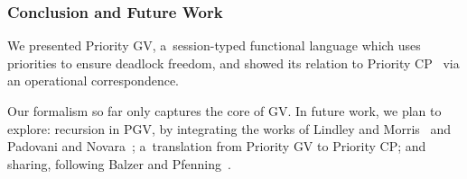 \documentclass[main.tex]{subfiles}
\begin{document}
\subsubsection*{Conclusion and Future Work}
We presented Priority GV, a~session-typed functional language which uses priorities to ensure deadlock freedom, and showed its relation to Priority CP~\cite{dardhagay18} via an operational correspondence.

Our formalism so far only captures the core of GV. In future work, we plan to explore: recursion in PGV, by integrating the works of Lindley and Morris~\cite{lindleymorris16} and Padovani and Novara~\cite{padovaninovara15}; a~translation from Priority GV to Priority CP; and sharing, following Balzer and Pfenning~\cite{balzerpfenning17}.
\end{document}

